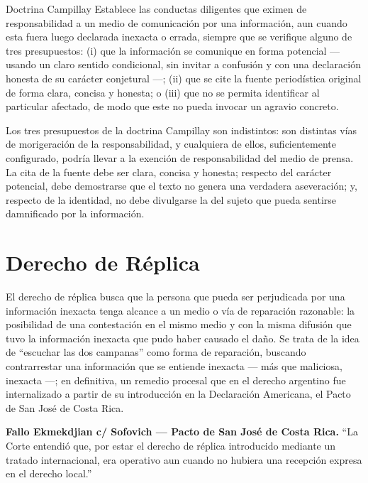 \documentclass[12pt,oneside]{book}
\begin{document}
\begin{definition}{Doctrina Campillay}
Establece las conductas diligentes que eximen de responsabilidad a un medio de comunicación por una información, aun cuando esta fuera luego declarada inexacta o errada, siempre que se verifique alguno de tres presupuestos: (i) que la información se comunique en forma potencial --- usando un claro sentido condicional, sin invitar a confusión y con una declaración honesta de su carácter conjetural ---; (ii) que se cite la fuente periodística original de forma clara, concisa y honesta; o (iii) que no se permita identificar al particular afectado, de modo que este no pueda invocar un agravio concreto.
\end{definition}

Los tres presupuestos de la doctrina Campillay son indistintos: son distintas vías de morigeración de la responsabilidad, y cualquiera de ellos, suficientemente configurado, podría llevar a la exención de responsabilidad del medio de prensa. La cita de la fuente debe ser clara, concisa y honesta; respecto del carácter potencial, debe demostrarse que el texto no genera una verdadera aseveración; y, respecto de la identidad, no debe divulgarse la del sujeto que pueda sentirse damnificado por la información.

\section{Derecho de Réplica}

El derecho de réplica busca que la persona que pueda ser perjudicada por una información inexacta tenga alcance a un medio o vía de reparación razonable: la posibilidad de una contestación en el mismo medio y con la misma difusión que tuvo la información inexacta que pudo haber causado el daño. Se trata de la idea de ``escuchar las dos campanas'' como forma de reparación, buscando contrarrestar una información que se entiende inexacta --- más que maliciosa, inexacta ---; en definitiva, un remedio procesal que en el derecho argentino fue internalizado a partir de su introducción en la Declaración Americana, el Pacto de San José de Costa Rica.

\begin{important}
\textbf{Fallo Ekmekdjian c/ Sofovich --- Pacto de San José de Costa Rica.} ``La Corte entendió que, por estar el derecho de réplica introducido mediante un tratado internacional, era operativo aun cuando no hubiera una recepción expresa en el derecho local.''
\end{important}
\end{document}
